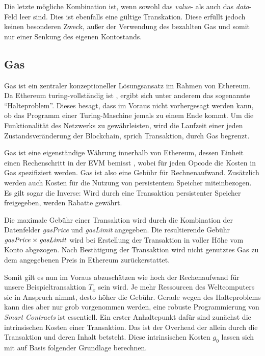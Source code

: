 \documentclass[runningheads]{llncs}
\begin{document}
Die letzte mögliche Kombination ist, wenn sowohl das \textit{value}- als auch das \textit{data}-Feld leer sind. Dies ist ebenfalls eine gültige Transkation. Diese erfüllt jedoch keinen besonderen Zweck, außer der Verwendung des bezahlten Gas und somit nur einer Senkung des eigenen Kontostands.

\subsection{Gas}
\label{gas}
Gas ist ein zentraler konzeptioneller Lösungsansatz im Rahmen von Ethereum. Da Ethereum turing-vollständig ist \cite[S. 1]{wood_ethereum/yellowpaper_2019}, ergibt sich unter anderem das sogenannte "`Halteproblem"'. Dieses besagt, dass im Voraus nicht vorhergesagt werden kann, ob das Programm einer Turing-Maschine jemals zu einem Ende kommt. \cite[S.70]{davis_computability_2013} Um die Funktionalität des Netzwerks zu gewährleisten, wird die Laufzeit einer jeden Zustandsveränderung der Blockchain, sprich Transaktion, durch Gas begrenzt.

Gas ist eine eigenständige Währung innerhalb von Ethereum, dessen Einheit einen Rechenschritt in der EVM bemisst \cite[S. 9:3]{m.spain_oasics-tokeneconomics_2019}, wobei für jeden Opcode die Kosten in Gas spezifiziert werden. \cite[S. 25 ff.]{wood_ethereum/yellowpaper_2019} Gas ist also eine Gebühr für Rechnenaufwand. Zusätzlich werden auch Kosten für die Nutzung von persistentem Speicher miteinbezogen. Es gilt sogar die Inverse: Wird durch eine Transaktion persistenter Speicher freigegeben, werden Rabatte gewährt.

Die maximale Gebühr einer Transaktion wird durch die Kombination der Datenfelder \textit{gasPrice} und \textit{gasLimit} angegeben. Die resultierende Gebühr $ \text{\textit{gasPrice}} \times \text{\textit{gasLimit}} $ wird bei Erstellung der Transaktion in voller Höhe vom Konto abgezogen. Nach Bestätigung der Transaktion wird nicht genutztes Gas zu dem angegebenen Preis in Ethereum zurückerstattet.

Somit gilt es nun im Voraus abzuschätzen wie hoch der Rechenaufwand für unsere Beispieltransaktion $ T_x $ sein wird. Je mehr Ressourcen des Weltcomputers sie in Anspruch nimmt, desto höher die Gebühr. Gerade wegen des Halteproblems kann dies aber nur grob vorgenommen werden, eine robuste Programmierung von \textit{Smart Contracts} ist essentiell. Ein erster Anhaltepunkt dafür sind zunächst die intrinsischen Kosten einer Transaktion. Das ist der Overhead der allein durch die Transaktion und deren Inhalt betsteht. Diese intrinsischen Kosten $ g_0 $ lassen sich mit auf Basis folgender Grundlage berechnen.
\end{document}
